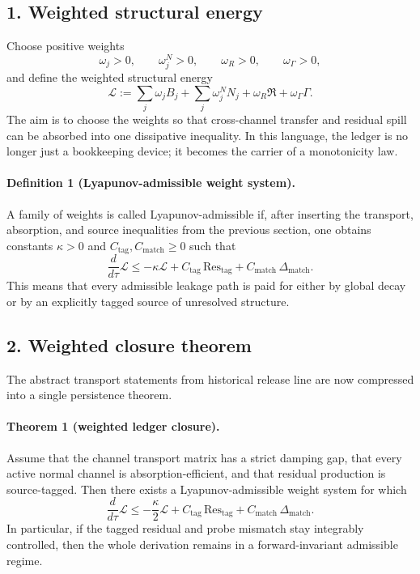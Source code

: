 \documentclass[12pt,a4paper]{article}
\DeclareRobustCommand{\QSCver}[1]{archival stage}
\renewcommand{\QSCver}[1]{historical release line}
\begin{document}
\subsection*{1. Weighted structural energy}
Choose positive weights
\[
\omega_j>0,
\qquad
\omega^{N}_j>0,
\qquad
\omega_R>0,
\qquad
\omega_\Gamma>0,
\]
and define the weighted structural energy
\[
\mathcal L
:=\sum_j \omega_j B_j + \sum_j \omega^{N}_j N_j + \omega_R\mathfrak R + \omega_\Gamma\Gamma.
\]
The aim is to choose the weights so that cross-channel transfer and residual spill
can be absorbed into one dissipative inequality. In this language, the ledger is no
longer just a bookkeeping device; it becomes the carrier of a monotonicity law.

\paragraph{Definition 1 (Lyapunov-admissible weight system).}
A family of weights is called Lyapunov-admissible if, after inserting the transport,
absorption, and source inequalities from the previous section, one obtains constants
$\kappa>0$ and $C_{\mathrm{tag}},C_{\mathrm{match}}\ge0$ such that
\[
\frac{d}{d\tau}\mathcal L
\le -\kappa \mathcal L
+ C_{\mathrm{tag}}\,\mathrm{Res}_{\mathrm{tag}}
+ C_{\mathrm{match}}\,\Delta_{\mathrm{match}}.
\]
This means that every admissible leakage path is paid for either by global decay or
by an explicitly tagged source of unresolved structure.

\subsection*{2. Weighted closure theorem}
The abstract transport statements from \QSCver{v2.5.0} are now compressed into a single
persistence theorem.

\paragraph{Theorem 1 (weighted ledger closure).}
Assume that the channel transport matrix has a strict damping gap, that every active
normal channel is absorption-efficient, and that residual production is source-tagged.
Then there exists a Lyapunov-admissible weight system for which
\[
\frac{d}{d\tau}\mathcal L
\le -\frac{\kappa}{2}\mathcal L
+ C_{\mathrm{tag}}\,\mathrm{Res}_{\mathrm{tag}}
+ C_{\mathrm{match}}\,\Delta_{\mathrm{match}}.
\]
In particular, if the tagged residual and probe mismatch stay integrably controlled,
then the whole derivation remains in a forward-invariant admissible regime.
\end{document}
